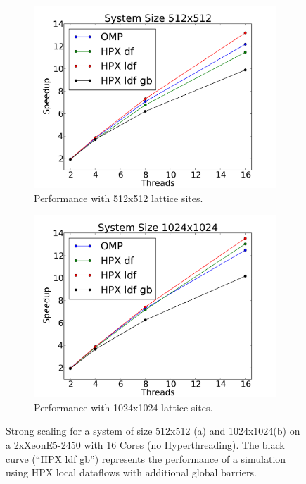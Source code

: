 \documentclass[a4wide,10pt]{scrartcl}
\begin{document}
\begin{figure}
 \begin{subfigure}[b]{0.49\textwidth}
  \centering
  \includegraphics[width=\textwidth]{../plot/marvin_scaling_512.pdf}\hfill
  \caption{Performance with 512x512 lattice sites.} 
  \label{fig:scaling_marvin_512}
 \end{subfigure}
 \begin{subfigure}[b]{0.49\textwidth}
  \centering
  \includegraphics[width=\textwidth]{../plot/marvin_scaling_1024.pdf}\hfill
  \caption{Performance with 1024x1024 lattice sites.} 
  \label{fig:scaling_marvin_1024}
 \end{subfigure}
 \caption{Strong scaling for a system of size 512x512 (a) and 1024x1024(b) on a 2xXeonE5-2450 with 16 Cores (no Hyperthreading). The black curve (``HPX ldf gb'') represents the performance of a simulation using HPX local dataflows with additional global barriers.}
 \label{fig:marvin_scaling}
\end{figure}
\end{document}
